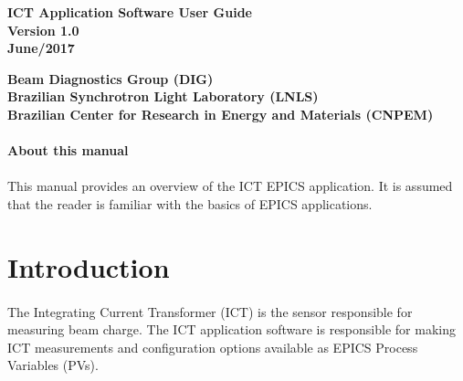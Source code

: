 \documentclass[openany]{article}
\begin{document}
\begin{titlepage}

\thispagestyle{fancy}

\begin{center}

\vspace*{\fill}
\textbf{\Huge ICT Application Software User Guide}\\[20pt]
\textbf{\Huge Version 1.0}\\[20pt]
\textbf{\Huge June/2017}
\vspace*{\fill}

\vfill
\textbf{Beam Diagnostics Group (DIG)}\\[5pt]
\textbf{Brazilian Synchrotron Light Laboratory (LNLS)}\\[5pt]
\textbf{Brazilian Center for Research in Energy and Materials (CNPEM)}
\end{center}

\end{titlepage}

\newpage
\pagestyle{plain} %

\paragraph{}{\Large\bfseries About this manual}

\paragraph{} This manual provides an overview of the ICT EPICS application. It is assumed that the reader is familiar with the basics of EPICS applications.

\tableofcontents

\newpage
\section{Introduction}

\paragraph{} The Integrating Current Transformer (ICT) is the sensor responsible for measuring beam charge. The ICT application software is responsible for making ICT measurements and configuration options available as EPICS Process Variables (PVs).
\end{document}
